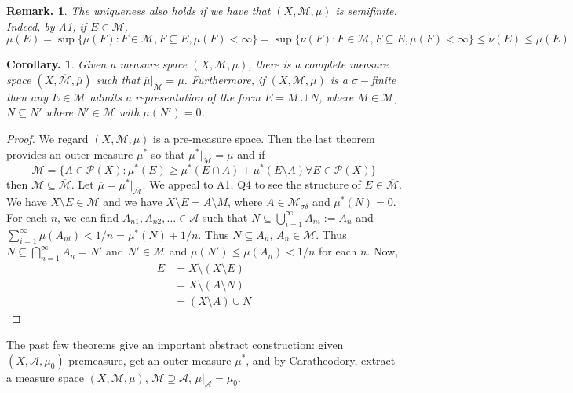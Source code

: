 \documentclass[11pt, a4paper]{memoir}
\theoremstyle{change}
\newtheorem{corollary}[theorem]{Corollary.}
\theoremstyle{plain}
\theoremstyle{nonumberplain}
\newtheorem{remark}{Remark.}
\newtheorem{proof}{Proof}
\begin{document}
\begin{remark}
    The uniqueness also holds if we have that $(X,\mathcal{M},\mu)$ is semifinite.
    Indeed, by A1, if $E\in\mathcal{M}$,
    \begin{equation*}\mu(E)=\sup\{\mu(F):F\in\mathcal{M},F\subseteq E,\mu(F)<\infty\}=\sup\{\nu(F):F\in\mathcal{M},F\subseteq E,\mu(F)<\infty\}\leq\nu(E)\leq\mu(E)\end{equation*}
\end{remark}
\begin{corollary}
    Given a measure space $(X,\mathcal{M},\mu)$, there is a complete measure space $(X,\overline{\mathcal{M}},\overline{\mu})$ such that $\overline{\mu}|_{\mathcal{M}}=\mu$.
    Furthermore, if $(X,\mathcal{M},\mu)$ is a $\sigma-$finite then any $E\in\mathcal{M}$ admits a representation of the form $E=M\cup N$, where $M\in\mathcal{M}$, $N\subseteq N'$ where $N'\in\mathcal{M}$ with $\mu(N')=0$.
\end{corollary}
\begin{proof}
    We regard $(X,\mathcal{M},\mu)$ is a pre-measure space.
    Then the last theorem provides an outer measure $\mu^*$ so that $\mu^*|_{\mathcal{M}}=\mu$ and if
    \begin{equation*}
        \mathcal{M}=\{A\in\mathcal{P}(X):\mu^*(E)\geq\mu^*(E\cap A)+\mu^*(E\setminus A)\forall E\in\mathcal{P}(X)\}
    \end{equation*}
    then $\mathcal{M}\subseteq\overline{\mathcal{M}}$.
    Let $\overline{\mu}=\mu^*|_{\overline{\mathcal{M}}}$.
    We appeal to A1, Q4 to see the structure of $E\in\overline{\mathcal{M}}$.
    We have $X\setminus E\in\mathcal{M}$ and we have $X\setminus E=A\setminus M$, where $A\in\mathcal{M}_{\sigma\delta}$ and $\mu^*(N)=0$.
    For each $n$, we can find $A_{n1},A_{n2},\ldots\in\mathcal{A}$ such that $N\subseteq\bigcup_{i=1}^\infty A_{ni}:=A_n$ and $\sum_{i=1}^\infty \mu(A_{ni})<1/n=\mu^*(N)+1/n$.
    Thus $N\subseteq A_n$, $A_n\in\mathcal{M}$.
    Thus $N\subseteq\bigcap_{n=1}^\infty A_n=N'$ and $N'\in\mathcal{M}$ and $\mu(N')\leq\mu(A_n)<1/n$ for each $n$.
    Now,
    \begin{align*}
        E&=X\setminus(X\setminus E)\\
         &=X\setminus(A\setminus N)\\
         &=(X\setminus A)\cup N
    \end{align*}
\end{proof}
The past few theorems give an important abstract construction: given $(X,\mathcal{A},\mu_0)$ premeasure, get an outer measure $\mu^*$, and by Caratheodory, extract a measure space $(X,\mathcal{M},\mu)$, $\mathcal{M}\supseteq\mathcal{A}$, $\mu|_{\mathcal{A}}=\mu_0$.
\end{document}
